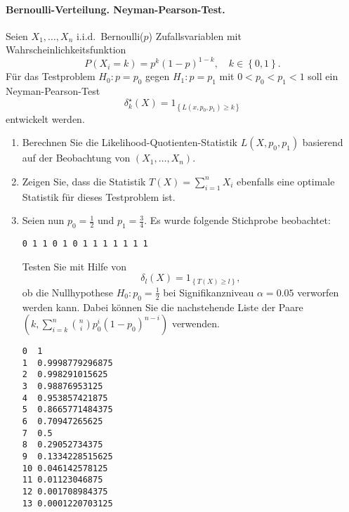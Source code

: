 \paragraph{Bernoulli-Verteilung. Neyman-Pearson-Test.} Seien $X_1,\ldots,X_n$ 
i.i.d.\ Bernoulli($p$) Zufallsvariablen mit Wahrscheinlichkeitsfunktion
\begin{equation*}
    P(X_i = k) = p^{k} \left( 1-p \right)^{1-k}, \quad k\in\left\{ 0,1 \right\}.
\end{equation*}
Für das Testproblem $H_0 : p=p_0$ gegen $H_1 : p=p_1$ mit $0<p_0<p_1<1$ 
soll ein Neyman-Pearson-Test
\begin{equation*}
    \delta_k^\star (X) = 1_{ \left\{ L(x,p_0,p_1)\geq k \right\}  }
\end{equation*}
entwickelt werden.
\begin{enumerate}
    \item Berechnen Sie die Likelihood-Quotienten-Statistik $L(X,p_0,p_1)$ basierend auf der
        Beobachtung von $\left( X_1,\ldots,X_n \right)$.
    \item Zeigen Sie, dass die Statistik $T(X)= \sum_{i=1}^{n} X_i$ ebenfalls eine
        optimale Statistik für dieses Testproblem ist.
    \item Seien nun $p_0=\frac{1}{2}$ und $p_1=\frac{3}{4}$. Es wurde folgende Stichprobe beobachtet:
        \begin{lstlisting}
0 1 1 0 1 0 1 1 1 1 1 1 1
        \end{lstlisting}
        Testen Sie mit Hilfe von 
        \begin{equation*}
            \delta_l(X) = 1_{   \left\{ T(X) \geq l \right\}},
        \end{equation*}
        ob die Nullhypothese $H_0 : p_0=\frac{1}{2}$ bei Signifikanzniveau $\alpha=0.05$
        verworfen werden kann. Dabei können Sie die nachstehende Liste der Paare 
        $\left( k, \sum_{i=k}^{n} \binom{n}{i} p_0^i \left( 1-p_0 \right)^{n-i} \right)$ verwenden.
        \begin{lstlisting}
0  1
1  0.9998779296875
2  0.998291015625
3  0.98876953125
4  0.953857421875
5  0.8665771484375
6  0.70947265625
7  0.5
8  0.29052734375
9  0.1334228515625
10 0.046142578125
11 0.01123046875
12 0.001708984375
13 0.0001220703125
\end{lstlisting}            

\end{enumerate}


